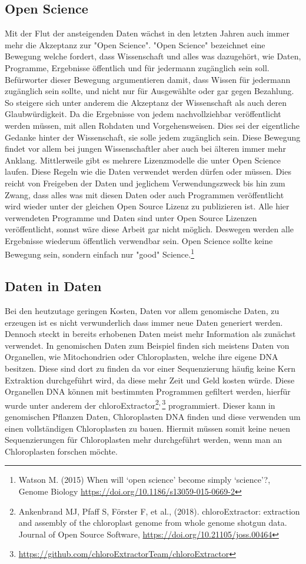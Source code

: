 \documentclass{scrartcl}
\begin{document}
\subsection{Open Science}
\label{sec-2-3}
Mit der Flut der ansteigenden Daten wächst in den letzten Jahren auch immer mehr die Akzeptanz zur "Open Science".
"Open Science" bezeichnet eine Bewegung welche fordert, dass Wissenschaft und alles was dazugehört, wie Daten, Programme, Ergebnisse öffentlich und für jedermann 
zugänglich sein soll. Befürworter dieser Bewegung argumentieren damit, dass Wissen für jedermann zugänglich sein sollte, und nicht nur für Ausgewählte oder gar
gegen Bezahlung. So steigere sich unter anderem die Akzeptanz der Wissenschaft als auch deren Glaubwürdigkeit. Da die Ergebnisse von jedem nachvollziehbar 
veröffentlicht werden müssen, mit allen Rohdaten und Vorgehensweisen. Dies sei der eigentliche Gedanke hinter der Wissenschaft, sie solle jedem zugänglich sein.
Diese Bewegung findet vor allem bei jungen Wissenschaftler aber auch bei älteren immer mehr Anklang. Mittlerweile gibt es mehrere Lizenzmodelle die unter
Open Science laufen. Diese Regeln wie die Daten verwendet werden dürfen oder müssen. Dies reicht von Freigeben der Daten und jeglichem Verwendungszweck bis hin
zum Zwang, dass alles was mit diesen Daten oder auch Programmen veröffentlicht wird wieder unter der gleichen Open Source Lizenz zu publizieren ist.
Alle hier verwendeten Programme und Daten sind unter Open Source Lizenzen veröffentlicht, sonnst wäre diese Arbeit gar nicht möglich. 
Deswegen werden alle Ergebnisse wiederum öffentlich verwendbar sein. Open Science sollte keine Bewegung sein, sondern einfach nur "good" Science.\footnote{Watson M. (2015) When will ‘open science’ become simply ‘science’?, Genome Biology \url{https://doi.org/10.1186/s13059-015-0669-2}}


\subsection{Daten in Daten}
\label{sec-2-4}
Bei den heutzutage geringen Kosten, Daten vor allem genomische Daten, zu erzeugen ist es nicht verwunderlich dass immer neue Daten generiert werden.
Dennoch steckt in bereits erhobenen Daten meist mehr Information als zunächst verwendet. In genomischen Daten zum Beispiel finden sich meistens Daten 
von Organellen, wie Mitochondrien oder Chloroplasten, welche ihre eigene DNA besitzen. Diese sind dort zu finden da vor einer Sequenzierung häufig keine 
Kern Extraktion durchgeführt wird, da diese mehr Zeit und Geld kosten würde. Diese Organellen DNA können mit bestimmten Programmen gefiltert werden, hierfür 
wurde unter anderem der chloroExtractor\footnote{Ankenbrand MJ, Pfaff S, Förster F, et al., (2018). chloroExtractor: extraction and assembly of the chloroplast genome from whole genome shotgun data. Journal of Open Source Software, \url{https://doi.org/10.21105/joss.00464}}\textsuperscript{,}\,\footnote{\url{https://github.com/chloroExtractorTeam/chloroExtractor}} programmiert. Dieser kann in genomischen Pflanzen Daten, Chloroplasten DNA finden und diese verwenden um einen vollständigen
Chloroplasten zu bauen. Hiermit müssen somit keine neuen Sequenzierungen für Chloroplasten mehr durchgeführt werden, wenn man an Chloroplasten forschen möchte.
\end{document}
